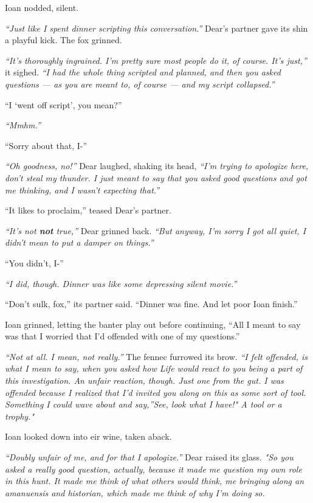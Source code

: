 Ioan nodded, silent.

\emph{``Just like I spent dinner scripting this conversation.''} Dear's partner gave its shin a playful kick. The fox grinned.

\emph{``It's thoroughly ingrained. I'm pretty sure most people do it, of course. It's just,''} it sighed. \emph{``I had the whole thing scripted and planned, and then you asked questions --- as you are meant to, of course --- and my script collapsed.''}

``I `went off script', you mean?''

\emph{``Mmhm.''}

``Sorry about that, I-''

\emph{``Oh goodness, no!''} Dear laughed, shaking its head, \emph{``I'm trying to apologize here, don't steal my thunder. I just meant to say that you asked good questions and got me thinking, and I wasn't expecting that.''}

``It likes to proclaim,'' teased Dear's partner.

\emph{``It's not \textbf{not} true,''} Dear grinned back. \emph{``But anyway, I'm sorry I got all quiet, I didn't mean to put a damper on things.''}

``You didn't, I-''

\emph{``I did, though. Dinner was like some depressing silent movie.''}

``Don't sulk, fox,'' its partner said. ``Dinner was fine. And let poor Ioan finish.''

Ioan grinned, letting the banter play out before continuing, ``All I meant to say was that I worried that I'd offended with one of my questions.''

\emph{``Not at all. I mean, not really.''} The fennec furrowed its brow. \emph{``I felt offended, is what I mean to say, when you asked how Life would react to you being a part of this investigation. An unfair reaction, though. Just one from the gut. I was offended because I realized that I'd invited you along on this as some sort of tool. Something I could wave about and say,''See, look what I have!" A tool or a trophy."}

Ioan looked down into eir wine, taken aback.

\emph{``Doubly unfair of me, and for that I apologize.''} Dear raised its glass. \emph{"So you asked a really good question, actually, because it made me question my own role in this hunt. It made me think of what others would think, me bringing along an amanuensis and historian, which made me think of why I'm doing so.}

